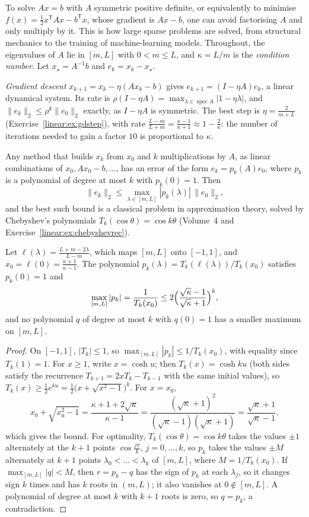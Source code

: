 To solve $Ax=b$ with $A$ symmetric positive definite, or equivalently to minimise $f(x)=\frac12x^{\mathsf T}Ax-b^{\mathsf T}x$, whose gradient
is $Ax-b$, one can avoid factorising $A$ and only multiply by it. This is how large sparse problems are solved, from structural
mechanics to the training of machine-learning models. Throughout, the eigenvalues of $A$ lie in $[m,L]$ with $0<m\le L$, and
$\kappa=L/m$ is the \emph{condition number}. Let $x_\star=A^{-1}b$ and $e_k=x_k-x_\star$.

\emph{Gradient descent} $x_{k+1}=x_k-\eta(Ax_k-b)$ gives $e_{k+1}=(I-\eta A)e_k$, a linear dynamical system. Its rate is
$\rho(I-\eta A)=\max_{\lambda\in\operatorname{spec}A}|1-\eta\lambda|$, and $\|e_k\|_2\le\rho^k\|e_0\|_2$ exactly, as $I-\eta A$ is symmetric.
The best step is $\eta=\frac2{m+L}$ (Exercise~\ref{linear:ex:gdstep}), with rate $\frac{L-m}{L+m}=\frac{\kappa-1}{\kappa+1}\approx1-\frac2\kappa$: the
number of iterations needed to gain a factor $10$ is proportional to $\kappa$.

Any method that builds $x_k$ from $x_0$ and $k$ multiplications by $A$, as linear combinations of $x_0,Ax_0-b,\dots$, has an error of the
form $e_k=p_k(A)e_0$, where $p_k$ is a polynomial of degree at most $k$ with $p_k(0)=1$. Then
\[
\|e_k\|_2\le\max_{\lambda\in[m,L]}|p_k(\lambda)|\,\|e_0\|_2,
\]
and the best such bound is a classical problem in approximation theory, solved by Chebyshev's polynomials $T_k(\cos\theta)=\cos k\theta$
(Volume~4 and Exercise~\ref{linear:ex:chebyshevrec}).

\begin{theorem}\label{linear:thm:chebyshevaccel}
Let $\ell(\lambda)=\frac{L+m-2\lambda}{L-m}$, which maps $[m,L]$ onto $[-1,1]$, and $x_0=\ell(0)=\frac{\kappa+1}{\kappa-1}$. The polynomial
$p_k(\lambda)=T_k(\ell(\lambda))/T_k(x_0)$ satisfies $p_k(0)=1$ and
\[
\max_{[m,L]}|p_k|=\frac1{T_k(x_0)}\le2\Bigl(\frac{\sqrt\kappa-1}{\sqrt\kappa+1}\Bigr)^k,
\]
and no polynomial $q$ of degree at most $k$ with $q(0)=1$ has a smaller maximum on $[m,L]$.
\end{theorem}
\begin{proof}
On $[-1,1]$, $|T_k|\le1$, so $\max_{[m,L]}|p_k|\le1/T_k(x_0)$, with equality since $T_k(1)=1$. For $x\ge1$, write $x=\cosh u$; then
$T_k(x)=\cosh ku$ (both sides satisfy the recurrence $T_{k+1}=2xT_k-T_{k-1}$ with the same initial values), so $T_k(x)\ge\frac12e^{ku}=
\frac12\bigl(x+\sqrt{x^2-1}\bigr)^k$. For $x=x_0$,
\[
x_0+\sqrt{x_0^2-1}=\frac{\kappa+1+2\sqrt\kappa}{\kappa-1}=\frac{(\sqrt\kappa+1)^2}{(\sqrt\kappa-1)(\sqrt\kappa+1)}=\frac{\sqrt\kappa+1}{\sqrt\kappa-1},
\]
which gives the bound. For optimality, $T_k(\cos\theta)=\cos k\theta$ takes the values $\pm1$ alternately at the $k+1$ points $\cos\frac{j\pi}
k$, $j=0,\dots,k$, so $p_k$ takes the values $\pm M$ alternately at $k+1$ points $\lambda_0<\dots<\lambda_k$ of $[m,L]$, where $M=1/T_k(x_0)$.
If $\max_{[m,L]}|q|<M$, then $r=p_k-q$ has the sign of $p_k$ at each $\lambda_j$, so it changes sign $k$ times and has $k$ roots in
$(m,L)$; it also vanishes at $0\notin[m,L]$. A polynomial of degree at most $k$ with $k+1$ roots is zero, so $q=p_k$, a contradiction.
\end{proof}

